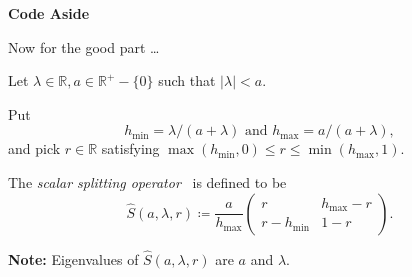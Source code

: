 \documentclass[handout]{beamer}
\newif\ifafterftpause
\begin{document}
{
  \afterftpausefalse

\begin{frame}

  \textbf{Code Aside} \pause

  \hspace{3cm}

  Now for the good part \ldots

\end{frame}

}

{
  \afterftpausefalse

\begin{frame}

  Let $\lambda \in \mathbb{R}, a \in \mathbb{R}^+ - \{0\}$ such that $\vert \lambda \vert < a$.

  \pause

  \vspace{5pt}

  Put $$ h_{\text{min}} = \lambda / (a + \lambda) \text{  and  } h_{\text{max}} = a / (a + \lambda),$$ and pick $r \in \mathbb{R}$ satisfying $\max{(h_{\text{min}},0)} \leq r \leq \min{(h_{\text{max}},1)}$.

  \pause

  \vspace{5pt}

  The \emph{scalar splitting operator}~\cite{ciampoliniDirectSolutionInverse2014} is defined to be $$\widehat{S}(a,\lambda,r) \coloneqq \frac{a}{h_{\text{max}}} \begin{pmatrix} r & h_{\text{max}} - r\\r - h_{\text{min}} & 1 - r \end{pmatrix}.$$

  \pause

  \textbf{Note:} Eigenvalues of $\widehat{S}(a,\lambda,r)$ are $a$ and $\lambda$.

  \pause


\end{frame}}
\end{document}
